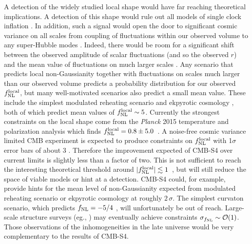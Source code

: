 A detection of the widely studied local shape would have far reaching theoretical implications. A detection of this shape would rule out all models of single clock inflation \cite{Creminelli:2004yq}. In addition, such a signal would open the door to significant cosmic variance on all scales from coupling of fluctuations within our observed volume to any super-Hubble modes \cite{Nelson:2012sb,LoVerde:2013xka,Nurmi:2013xv}. Indeed, there would be room for a significant shift between the observed amplitude of scalar fluctuations (and so the observed $r$) and the mean value of fluctuations on much larger scales \cite{Bonga:2015urq}. Any scenario that predicts local non-Gaussianity together with fluctuations on scales much larger than our observed volume predicts a probability distribution for our observed $f_{\rm NL}^{\rm local}$, but many well-motivated scenarios also predict a small mean value. These include the simplest modulated reheating scenario \cite{Zaldarriaga:2003my} and ekpyrotic cosmology \cite{Lehners:2009ja}, both of which predict mean values of $f_{\rm NL}^{\rm local}\sim5$. 
Currently the strongest constraints on the local shape come from the {\it Planck} 2015 temperature and polarization analysis which finds $f_{\rm NL}^{\rm local} = 0.8 \pm 5.0$~\cite{Ade:2015ava}. A noise-free cosmic variance limited CMB experiment is expected to produce constraints on $f_{\rm NL}^{\rm local}$ with 1$\sigma$ error bars of about 3 \cite{Komatsu:2001rj}. Therefore the improvement expected of CMB-S4 over current limits is slightly less than a factor of two. This is not sufficient to reach the interesting theoretical threshold around $|f_{\rm NL}^{\rm local}|\lesssim 1$~\cite{Alvarez:2014vva}, but will still reduce the space of viable models or hint at a detection. CMB-S4 could, for example, provide hints for the mean level of non-Gaussianity expected from modulated reheating scenario or ekpyrotic cosmology at roughly $2\,\sigma$. The simplest curvaton scenario, which predicts $f_{\rm NL} = -5/4$ \cite{Lyth:2001nq}, will unfortunately be out of reach. Large-scale structure surveys (eg., \cite{Dore:2014cca}) may eventually achieve constraints $\sigma_{f_{\rm NL}}\sim\mathcal{O}(1)$. Those observations of the inhomogeneities in the late universe would be very complementary to the results of CMB-S4.

